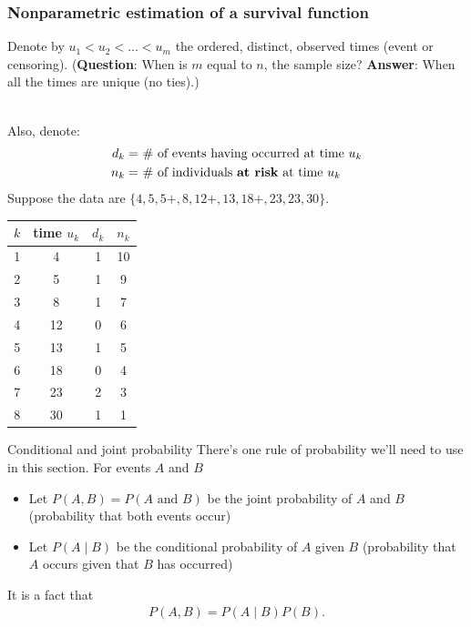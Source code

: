 \documentclass[10pt,t]{beamer}
\begin{document}
\begin{frame}
\frametitle{Nonparametric estimation of a survival function}
\vspace{-0.8cm}
Denote by $u_1 < u_2 < \dots < u_m$ the ordered, distinct, observed times (event or censoring). (\textbf{Question}: When is $m$ equal to $n$, the sample size?   \textbf{Answer}: When all the times are unique (no ties).)  
\\ ~\

Also, denote: 
\begin{align*}
d_k = & \ \text{\# of events having occurred at time $u_k$} \\
n_k = & \ \text{\# of individuals \textbf{at risk} at time $u_k$}
\end{align*}
Suppose the data are $\{4, 5, 5+, 8, 12+, 13, 18+, 23, 23, 30\}$.  

\begin{center}
\begin{tabular}{|c|c|c|c|}
\hline
$k$ & time $u_k$ & $d_k$ & $n_k$ \\
\hline
1 & 4 & 1 & 10 \\
2& 5 & 1 & 9 \\
3& 8 & 1 & 7 \\
4&12 & 0 & 6 \\
5&13 & 1 & 5 \\
6&18 & 0 & 4 \\
7&23 & 2 & 3 \\
8&30 & 1 & 1 \\
\hline
\end{tabular}
\end{center}
\end{frame}

\begin{frame}{Conditional and joint probability}
	There's one rule of probability we'll need to use in this section. For events $A$ and $B$
	\begin{itemize}
		\item Let $P(A, B) = P(A \text{ and } B)$ be the joint probability of $A$ and $B$ (probability that both events occur)
		\item Let $P(A \mid B)$ be the conditional probability of $A$ given $B$ (probability that $A$ occurs given that $B$ has occurred)
	\end{itemize}
	It is a fact that
	\begin{align*}
		P(A, B) = P(A \mid B)P(B).
	\end{align*}
\end{frame}
\end{document}
